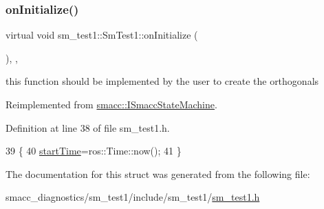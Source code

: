 \subsubsection{\texorpdfstring{on\+Initialize()}{onInitialize()}}
{\footnotesize\ttfamily virtual void sm\+\_\+test1\+::\+Sm\+Test1\+::on\+Initialize (\begin{DoxyParamCaption}{ }\end{DoxyParamCaption})\hspace{0.3cm}{\ttfamily [inline]}, {\ttfamily [override]}, {\ttfamily [virtual]}}



this function should be implemented by the user to create the orthogonals 



Reimplemented from \hyperlink{classsmacc_1_1ISmaccStateMachine_ac2982c6c8283663e5e1e8a7c82f511ec}{smacc\+::\+I\+Smacc\+State\+Machine}.



Definition at line 38 of file sm\+\_\+test1.\+h.


\begin{DoxyCode}
39     \{
40         \hyperlink{namespacesm__test1_abb9998c780883187824713b717353f85}{startTime}=ros::Time::now();
41     \}
\end{DoxyCode}


The documentation for this struct was generated from the following file\+:\begin{DoxyCompactItemize}
\item 
smacc\+\_\+diagnostics/sm\+\_\+test1/include/sm\+\_\+test1/\hyperlink{sm__test1_8h}{sm\+\_\+test1.\+h}\end{DoxyCompactItemize}
